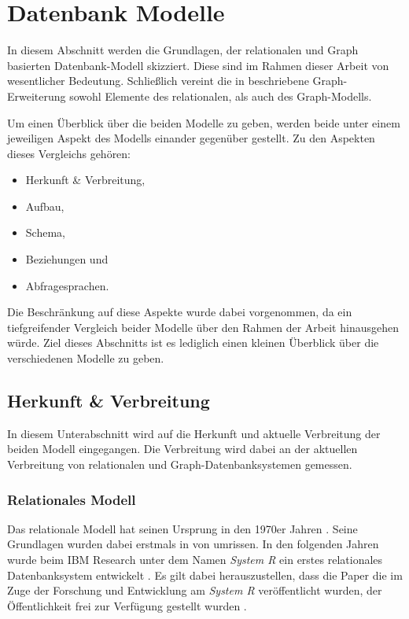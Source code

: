 \section{Datenbank Modelle}
In diesem Abschnitt werden die Grundlagen, der relationalen und Graph basierten Datenbank-Modell skizziert. Diese sind im Rahmen dieser Arbeit von wesentlicher Bedeutung. Schließlich vereint die in  beschriebene Graph-Erweiterung sowohl Elemente des relationalen, als auch des Graph-Modells.

Um einen Überblick über die beiden Modelle zu geben, werden beide unter einem jeweiligen Aspekt des Modells einander gegenüber gestellt. Zu den Aspekten dieses Vergleichs gehören: 

\begin{itemize}
    \item Herkunft \& Verbreitung,
    \item Aufbau,
    \item Schema,
    \item Beziehungen und
    \item Abfragesprachen.
\end{itemize}

Die Beschränkung auf diese Aspekte wurde dabei vorgenommen, da ein tiefgreifender Vergleich beider Modelle über den Rahmen der Arbeit hinausgehen würde. Ziel dieses Abschnitts ist es lediglich einen kleinen Überblick über die verschiedenen Modelle zu geben. 

\subsection{Herkunft \& Verbreitung}
In diesem Unterabschnitt wird auf die Herkunft und aktuelle Verbreitung der beiden Modell eingegangen. Die Verbreitung wird dabei an der aktuellen Verbreitung von relationalen und Graph-Datenbanksystemen gemessen. 

\subsubsection{Relationales Modell}
Das relationale Modell hat seinen Ursprung in den 1970er Jahren \cite{rdbms_history}. Seine Grundlagen wurden dabei erstmals in \cite{codd_relational_model} von \citeauthor{codd_relational_model} umrissen. In den folgenden Jahren  wurde beim IBM Research unter dem Namen \textit{System R} ein erstes relationales Datenbanksystem entwickelt \cite{rdbms_history}. Es gilt dabei herauszustellen, dass die Paper die im Zuge der Forschung und Entwicklung am \textit{System R} veröffentlicht wurden, der Öffentlichkeit frei zur Verfügung gestellt wurden \cite{rdbms_history}. 

